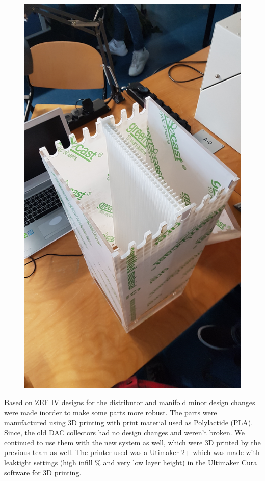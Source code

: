 \begin{figure}[H]
\begin{minipage}{.5\textwidth}
  \includegraphics[width=\linewidth, angle = 270]{images/mywork/Sprint1/AssembledPMMA.jpg}
  \label{fig:pmmaass2}
\end{minipage}
\end{figure}

Based on ZEF IV designs for the distributor and manifold minor design changes were made inorder to make some parts more robust. The parts were manufactured using 3D printing with print material used as Polylactide (PLA). Since, the old DAC collectors had no design changes and weren't broken. We continued to use them with the new system as well, which were 3D printed by the previous team as well. The printer used was a Utimaker 2+ which was made with leaktight settings (high infill \% and very low layer height) in the Ultimaker Cura software for 3D printing. 

